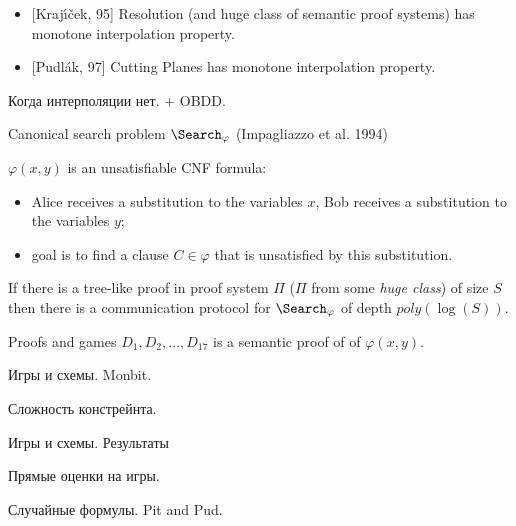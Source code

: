 \begin{frame}

    \begin{theorem}
        \begin{itemize}
            \item {[Kraj{\'{\i}}{\v{c}}ek, 95]} Resolution (and huge class of semantic proof systems) has
                monotone interpolation property.
            \item {[Pudl{\'{a}}k, 97]} Cutting Planes has monotone interpolation property.
        \end{itemize}
    \end{theorem}
\end{frame}

\begin{frame}

	Когда интерполяции нет. + OBDD.
\end{frame}


\begin{frame}{Canonical search problem $\Search_{\varphi}$ (Impagliazzo et al. 1994)}

	
    $\varphi(x, y)$ is an unsatisfiable CNF formula:
    \begin{itemize}
        \item Alice receives a substitution to the variables $x$, Bob receives a substitution to the
            variables $y$;
        \item goal is to find a clause $C \in \varphi$ that is unsatisfied by this substitution.
    \end{itemize}

    \pause

    \begin{theorem}
        If there is a {\color{blue} tree-like} proof in proof system $\Pi$ ($\Pi$ from some \textit{huge
          class}) of size $S$ then there is a communication protocol for $\Search_{\varphi}$ of depth
        $poly(\log(S))$.
    \end{theorem}
    
\end{frame}


\begin{frame}{Proofs and games}
	$D_1, D_2, \dots, D_{17}$ is a semantic proof of of $\varphi(x, y)$.

    \begin{center}
    	    
    \end{center}

\end{frame}

\begin{frame}
    Игры и схемы. Monbit.
\end{frame}
    


\begin{frame}

    Сложность констрейнта.

    Игры и схемы. Результаты

    Прямые оценки на игры.
\end{frame}


\begin{frame}

	Случайные формулы.  Pit and Pud.
\end{frame}